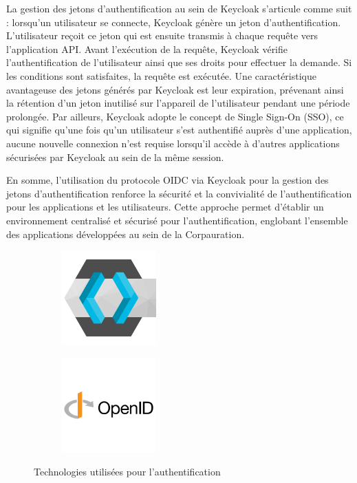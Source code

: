 La gestion des jetons d'authentification au sein de Keycloak s'articule comme suit : lorsqu'un utilisateur se connecte, Keycloak génère un jeton d'authentification. L'utilisateur reçoit ce jeton qui est ensuite transmis à chaque requête vers l'application API. Avant l'exécution de la requête, Keycloak vérifie l'authentification de l'utilisateur ainsi que ses droits pour effectuer la demande. Si les conditions sont satisfaites, la requête est exécutée. Une caractéristique avantageuse des jetons générés par Keycloak est leur expiration, prévenant ainsi la rétention d'un jeton inutilisé sur l'appareil de l'utilisateur pendant une période prolongée. Par ailleurs, Keycloak adopte le concept de Single Sign-On (SSO), ce qui signifie qu'une fois qu'un utilisateur s'est authentifié auprès d'une application, aucune nouvelle connexion n'est requise lorsqu'il accède à d'autres applications sécurisées par Keycloak au sein de la même session.

En somme, l'utilisation du protocole OIDC via Keycloak pour la gestion des jetons d'authentification renforce la sécurité et la convivialité de l'authentification pour les applications et les utilisateurs. Cette approche permet d'établir un environnement centralisé et sécurisé pour l'authentification, englobant l'ensemble des applications développées au sein de la Corpauration.

\begin{figure}
	\centering
	\begin{subfigure}{.45\textwidth}
		\centering
		\includegraphics[width=0.40\textwidth]{assets/keycloak.png}
		\label{fig:keycloak}
	\end{subfigure}
	\begin{subfigure}{.45\textwidth}
		\centering
		\includegraphics[width=0.40\textwidth]{assets/openid.png}
		\label{fig:openid}
	\end{subfigure}
	\caption{Technologies utilisées pour l'authentification}
\end{figure}

